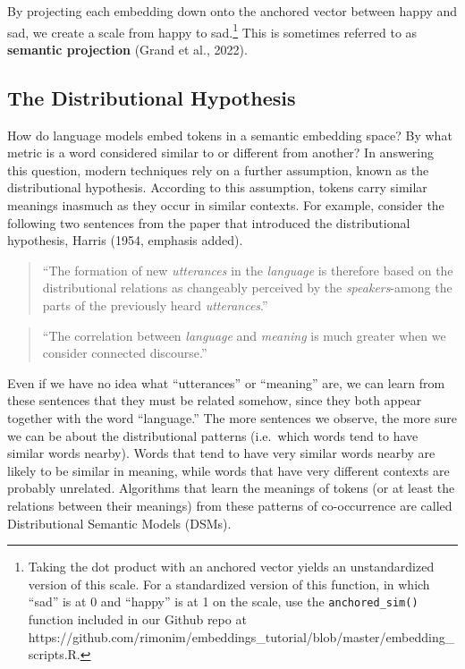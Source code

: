 \documentclass[
  man,
  floatsintext,
  longtable,
  nolmodern,
  notxfonts,
  notimes,
  colorlinks=true,linkcolor=blue,citecolor=blue,urlcolor=blue]{apa7}
\begin{document}
By projecting each embedding down onto the anchored vector between happy
and sad, we create a scale from happy to sad.\footnote{Taking the dot
  product with an anchored vector yields an unstandardized version of
  this scale. For a standardized version of this function, in which
  ``sad'' is at 0 and ``happy'' is at 1 on the scale, use the
  \texttt{anchored\_sim()} function included in our Github repo at
  https://github.com/rimonim/embeddings\_tutorial/blob/master/embedding\_scripts.R.}
This is sometimes referred to as \textbf{semantic projection} (Grand et
al., 2022).

\subsection{The Distributional
Hypothesis}\label{the-distributional-hypothesis}

How do language models embed tokens in a semantic embedding space? By
what metric is a word considered similar to or different from another?
In answering this question, modern techniques rely on a further
assumption, known as the distributional hypothesis. According to this
assumption, tokens carry similar meanings inasmuch as they occur in
similar contexts. For example, consider the following two sentences from
the paper that introduced the distributional hypothesis, Harris (1954,
emphasis added).

\begin{quote}
``The formation of new \emph{utterances} in the \emph{language} is
therefore based on the distributional relations as changeably perceived
by the \emph{speakers}-among the parts of the previously heard
\emph{utterances}.''
\end{quote}

\begin{quote}
``The correlation between \emph{language} and \emph{meaning} is much
greater when we consider connected discourse.''
\end{quote}

Even if we have no idea what ``utterances'' or ``meaning'' are, we can
learn from these sentences that they must be related somehow, since they
both appear together with the word ``language.'' The more sentences we
observe, the more sure we can be about the distributional patterns
(i.e.~which words tend to have similar words nearby). Words that tend to
have very similar words nearby are likely to be similar in meaning,
while words that have very different contexts are probably unrelated.
Algorithms that learn the meanings of tokens (or at least the relations
between their meanings) from these patterns of co-occurrence are called
Distributional Semantic Models (DSMs).
\end{document}

